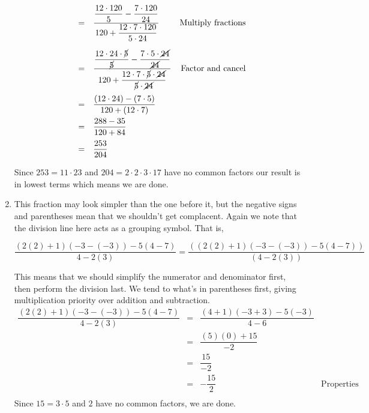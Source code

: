 \documentclass{ximera}
\begin{document}
\begin{example}
\begin{enumerate}
\[\begin{array}{rclr}
& = & \dfrac{\dfrac{12 \cdot 120}{5} - \dfrac{7 \cdot 120}{24}}{120 + \dfrac{12 \cdot 7 \cdot 120}{5 \cdot 24}} & \text{Multiply fractions} \\ [25pt]

& = & \dfrac{\dfrac{12 \cdot 24 \cdot \cancel{5}}{\cancel{5}} - \dfrac{7 \cdot 5 \cdot \cancel{24}}{\cancel{24}}}{120 + \dfrac{12 \cdot 7 \cdot \cancel{5} \cdot \cancel{24}}{\cancel{5} \cdot \cancel{24}}} & \text{Factor and cancel} \\[25pt]
 & = & \dfrac{(12 \cdot 24) - (7 \cdot 5)}{120 + (12 \cdot 7)} & \\[10pt]
 & = & \dfrac{288 - 35}{120 + 84} & \\[10pt]
 & = & \dfrac{253}{204} & \\
  \end{array} \] 
 
Since $253 = 11 \cdot 23$ and $204 = 2 \cdot 2 \cdot 3 \cdot 17$ have no common factors our result is in lowest terms which means we are done.


																					
\item  This fraction may look simpler than the one before it, but the negative signs and parentheses mean that we shouldn't get complacent.  Again we note that the division line here acts as a grouping symbol.  That is, 

\[ \dfrac{(2(2)+1)(-3-(-3)) - 5(4-7)}{4-2(3)} = \dfrac{\left((2(2)+1)(-3-(-3)) - 5(4-7) \right)}{(4-2(3))} \]

This means that we should simplify the numerator and denominator first, then perform the division last.  We tend to what's in parentheses first, giving multiplication priority over addition and subtraction.\[ \begin{array}{rclr}


\dfrac{(2(2)+1)(-3-(-3)) - 5(4-7)}{4-2(3)} & = & \dfrac{(4+1)(-3+3)-5(-3)}{4 - 6} &  \\ [8pt]
                                           & = & \dfrac{(5)(0) + 15}{-2}  & \\ [8pt]
																					 & = & \dfrac{15}{-2} & \\ [8pt]
																					 & = & -\dfrac{15}{2} & \text{Properties of Negatives} \\ \end{array} \]
Since $15 = 3\cdot 5$ and $2$ have no common factors, we are done.
																			




\end{enumerate}
\end{example}
\end{document}
